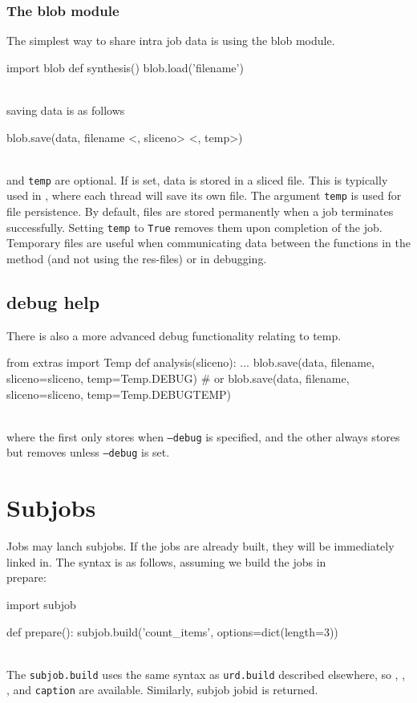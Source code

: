 \subsubsection*{The blob module}
The simplest way to share intra job data is using the blob module.
\\
\begin{python}
import blob
def synthesis()
  blob.load('filename')
\end{python}
\\
saving data is as follows
\\
\begin{python}
  blob.save(data, filename <, sliceno> <, temp>)
\end{python}
\\
\sliceno and \texttt{temp} are optional.  If \sliceno is set, data is
stored in a sliced file.  This is typically used in \analysis, where
each thread will save its own file.  The argument \texttt{temp} is
used for file persistence.  By default, files are stored permanently
when a job terminates successfully.  Setting \texttt{temp} to
\texttt{True} removes them upon completion of the job.  Temporary
files are useful when communicating data between the functions in the
method (and not using the res-files) or in debugging.


\subsection{debug help}
There is also a more advanced debug functionality relating to temp.
\\
\begin{python}
from extras import Temp
def analysis(sliceno):
  ...
  blob.save(data, filename, sliceno=sliceno, temp=Temp.DEBUG)
  # or
  blob.save(data, filename, sliceno=sliceno, temp=Temp.DEBUGTEMP)
\end{python}
\\
where the first only stores when \texttt{--debug} is specified, and
the other always stores but removes unless \texttt{--debug} is set.


\newpage
\section{Subjobs}

Jobs may lanch subjobs.  If the jobs are already built, they will be
immediately linked in.  The syntax is as follows, assuming we build
the jobs in \\prepare:
\\
\begin{python}
import subjob

def prepare():
  subjob.build('count_items', options=dict(length=3))
\end{python}
\\
The \texttt{subjob.build} uses the same syntax as \texttt{urd.build}
described elsewhere, so \options, \datasets, \jobids, and
\texttt{caption} are available.  Similarly, subjob jobid is returned.

